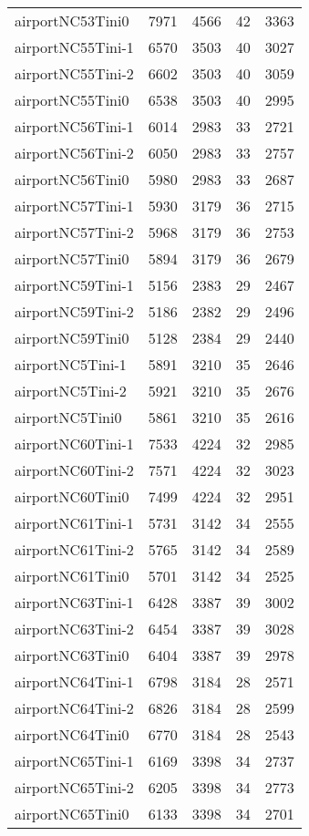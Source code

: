 \begin{longtable}{lrrrr}
airportNC53Tini0 & 7971 & 4566 & 42 & 3363 \\
airportNC55Tini-1 & 6570 & 3503 & 40 & 3027 \\
airportNC55Tini-2 & 6602 & 3503 & 40 & 3059 \\
airportNC55Tini0 & 6538 & 3503 & 40 & 2995 \\
airportNC56Tini-1 & 6014 & 2983 & 33 & 2721 \\
airportNC56Tini-2 & 6050 & 2983 & 33 & 2757 \\
airportNC56Tini0 & 5980 & 2983 & 33 & 2687 \\
airportNC57Tini-1 & 5930 & 3179 & 36 & 2715 \\
airportNC57Tini-2 & 5968 & 3179 & 36 & 2753 \\
airportNC57Tini0 & 5894 & 3179 & 36 & 2679 \\
airportNC59Tini-1 & 5156 & 2383 & 29 & 2467 \\
airportNC59Tini-2 & 5186 & 2382 & 29 & 2496 \\
airportNC59Tini0 & 5128 & 2384 & 29 & 2440 \\
airportNC5Tini-1 & 5891 & 3210 & 35 & 2646 \\
airportNC5Tini-2 & 5921 & 3210 & 35 & 2676 \\
airportNC5Tini0 & 5861 & 3210 & 35 & 2616 \\
airportNC60Tini-1 & 7533 & 4224 & 32 & 2985 \\
airportNC60Tini-2 & 7571 & 4224 & 32 & 3023 \\
airportNC60Tini0 & 7499 & 4224 & 32 & 2951 \\
airportNC61Tini-1 & 5731 & 3142 & 34 & 2555 \\
airportNC61Tini-2 & 5765 & 3142 & 34 & 2589 \\
airportNC61Tini0 & 5701 & 3142 & 34 & 2525 \\
airportNC63Tini-1 & 6428 & 3387 & 39 & 3002 \\
airportNC63Tini-2 & 6454 & 3387 & 39 & 3028 \\
airportNC63Tini0 & 6404 & 3387 & 39 & 2978 \\
airportNC64Tini-1 & 6798 & 3184 & 28 & 2571 \\
airportNC64Tini-2 & 6826 & 3184 & 28 & 2599 \\
airportNC64Tini0 & 6770 & 3184 & 28 & 2543 \\
airportNC65Tini-1 & 6169 & 3398 & 34 & 2737 \\
airportNC65Tini-2 & 6205 & 3398 & 34 & 2773 \\
airportNC65Tini0 & 6133 & 3398 & 34 & 2701 \\

\end{longtable}
